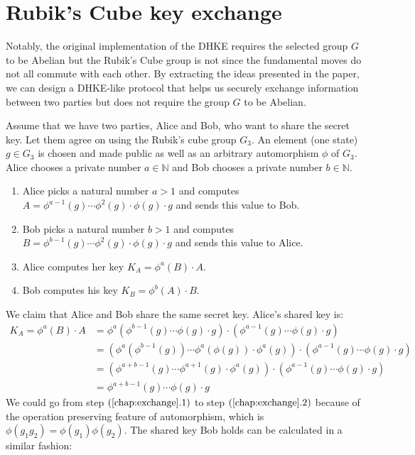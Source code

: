 \section{Rubik's Cube key exchange}
\par Notably, the original implementation of the DHKE requires the selected group $G$ to be Abelian but the Rubik's Cube group is not since the fundamental moves do not all commute with each other. By extracting the ideas presented in the paper\cite{exchange}, we can design a DHKE-like protocol that helps us securely exchange information between two parties but does not require the group $G$ to be Abelian.
\par Assume that we have two parties, Alice and Bob, who want to share the secret key. Let them agree on using the Rubik's cube group $G_3$. An element (one state) $g \in G_3$ is chosen and made public as well as an arbitrary automorphism $\phi$ of $G_3$. Alice chooses a private number $a \in \mathbb{N}$ and Bob chooses a private number $b \in \mathbb{N}$.
\begin{enumerate}
    \item Alice picks a natural number $a > 1$ and computes $A = \phi^{a - 1}(g) \cdots \phi^2(g) \cdot \phi(g) \cdot g$ and sends this value to Bob.
    \item Bob picks a natural number $b > 1$ and computes $B = \phi^{b - 1}(g) \cdots \phi^2(g) \cdot \phi(g) \cdot g$ and sends this value to Alice.
    \item Alice computes her key $K_A = \phi^a(B) \cdot A$.
    \item Bob computes his key $K_B = \phi^b(A) \cdot B$.
\end{enumerate}
We claim that Alice and Bob share the same secret key. Alice's shared key is:
\begin{align}
    K_A = \phi^a(B) \cdot A & = \phi^a(\phi^{b - 1}(g) \cdots \phi(g) \cdot g) \cdot ( \phi^{a - 1}(g) \cdots \phi(g) \cdot g) \\ 
    & = (\phi^a(\phi^{b - 1}(g)) \cdots \phi^{a}(\phi(g)) \cdot \phi^a(g)) \cdot ( \phi^{a - 1}(g) \cdots \phi(g) \cdot g) \\
    & = (\phi^{a + b - 1}(g) \cdots \phi^{a + 1}(g) \cdot \phi^a(g)) \cdot ( \phi^{a - 1}(g) \cdots \phi(g) \cdot g) \\
    & = \phi^{a + b - 1}(g) \cdots \phi(g) \cdot g
\end{align}
We could go from step $(\ref{chap:exchange}.1)$ to step $(\ref{chap:exchange}.2)$ because of the operation preserving feature of automorphism, which is $\phi(g_1g_2) = \phi(g_1)\phi(g_2)$. The shared key Bob holds can be calculated in a similar fashion:
